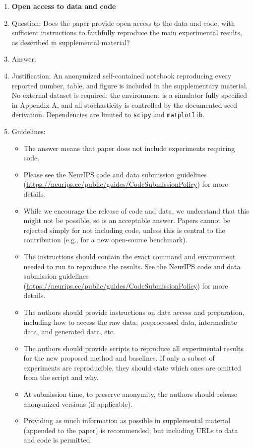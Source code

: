 \begin{enumerate}
\item {\bf Open access to data and code}
    \item[] Question: Does the paper provide open access to the data and code, with sufficient instructions to faithfully reproduce the main experimental results, as described in supplemental material?
    \item[] Answer: \answerYes{}
    \item[] Justification: An anonymized self-contained notebook reproducing every reported number, table, and figure is included in the supplementary material. No external dataset is required: the environment is a simulator fully specified in Appendix A, and all stochasticity is controlled by the documented seed derivation. Dependencies are limited to \texttt{scipy} and \texttt{matplotlib}.
    \item[] Guidelines:
    \begin{itemize}
        \item The answer \answerNA{} means that paper does not include experiments requiring code.
        \item Please see the NeurIPS code and data submission guidelines (\url{https://neurips.cc/public/guides/CodeSubmissionPolicy}) for more details.
        \item While we encourage the release of code and data, we understand that this might not be possible, so \answerNo{} is an acceptable answer. Papers cannot be rejected simply for not including code, unless this is central to the contribution (e.g., for a new open-source benchmark).
        \item The instructions should contain the exact command and environment needed to run to reproduce the results. See the NeurIPS code and data submission guidelines (\url{https://neurips.cc/public/guides/CodeSubmissionPolicy}) for more details.
        \item The authors should provide instructions on data access and preparation, including how to access the raw data, preprocessed data, intermediate data, and generated data, etc.
        \item The authors should provide scripts to reproduce all experimental results for the new proposed method and baselines. If only a subset of experiments are reproducible, they should state which ones are omitted from the script and why.
        \item At submission time, to preserve anonymity, the authors should release anonymized versions (if applicable).
        \item Providing as much information as possible in supplemental material (appended to the paper) is recommended, but including URLs to data and code is permitted.
    \end{itemize}



\end{enumerate}
